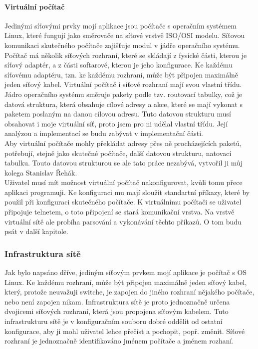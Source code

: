 \paragraph{Virtuální počítač}
Jedinými síťovými prvky mojí aplikace jsou počítače s operačním systémem Linux, které fungují jako směrovače na síťové vrstvě ISO/OSI modelu. Síťovou komunikaci skutečného počítače zajišťuje modul v jádře operačního systému. Počítač má několik síťových rozhraní, které se skládají z fysické části, kterou je síťový adaptér, a z části softarové, kterou je jeho konfigurace. Ke každému síťovému adaptéru, tzn. ke každému rozhraní, může být připojen maximálně jeden síťový kabel. Virtuální počítač i síťové rozhraní mají svou vlastní třídu.\\ 
Jádro operačního systému směruje pakety podle tzv. routovací tabulky, což je datová struktura, která obsahuje cílové adresy a akce, které se mají vykonat s paketem poslaným na danou cílovou adresu. Tuto datovou strukturu musí obsahovat i moje virtuální síť, proto jsem pro ni udělal vlastní třídu. Její analýzou a implementací se budu zabývat v implementační části.\\
Aby virtuální počítače mohly překládat adresy přes ně procházejících paketů, potřebují, stejně jako skutečné počítače, další datovou strukturu, natovací tabulku. Touto datovou strukturou se ale tato práce nezabývá, vytvořil ji můj kolega Stanislav Řehák.\\
Uživatel musí mít možnost virtuální počítač nakonfigurovat, kvůli tomu přece aplikaci programuji. Ke konfiguraci mu mají sloužit standartní příkazy, které by použil při konfiguraci skutečného počítače. K virtuálnímu počítači se uživatel připojuje telnetem, o toto připojení se stará komunikační vrstva. Na vrstvě virtuální sítě ale probíha parsování a vykonávání těchto příkazů. O tom budu psát v další kapitole.
\subsubsection{Infrastruktura sítě}
Jak bylo napsáno dříve, jediným síťovým prvkem mojí aplikace je počítač s OS Linux. Ke každému rozhraní, může být připojen maximálně jeden síťový kabel, který, protože neuvažuji switche, je zapojen do jiného rozhraní nějakého počítače, nebo není zapojen nikam.  Infrastruktura sítě je proto jednoznačně určena dvojicemi síťových rozhraní, která jsou propojena síťovým kabelem. Tuto infrastrukturu sítě je v konfiguračním souboru dobré oddělit od ostatní konfigurace, aby ji mohl uživatel lehce přečíst a pochopit, popř. změnit. Síťové rozhraní je jednoznačně identifikováno jménem počítače a jménem rozhaní.
